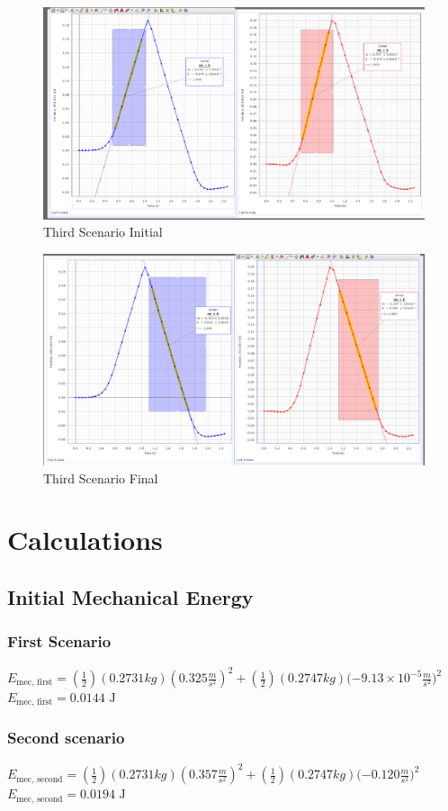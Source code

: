 \documentclass{article}
\begin{document}
\begin{figure}[H]
    \centering
    \includegraphics[width=0.75\linewidth]{third scenario initial.png}
    \caption{Third Scenario Initial}
    \label{fig:tsi}
\end{figure}
\begin{figure}[H]
    \centering
    \includegraphics[width=0.75\linewidth]{third scenario final.png}
    \caption{Third Scenario Final}
    \label{fig:tsf}
\end{figure}

\section{Calculations}
\subsection{Initial Mechanical Energy}
\subsubsection{First Scenario}
$E_{\text {mec, first}}=(\frac {1}{2})(0.2731 {kg})(0.325 \frac {m}{s^2})^2 +(\frac {1}{2})(0.2747 {kg})(-9.13 \times 10^{-5} {\frac {m}{s^2})}^2 $
\newline 
$E_{\text {mec, first}} = 0.0144 \text { J}$
\subsubsection{Second scenario}
$E_{\text {mec, second}}=(\frac {1}{2})(0.2731 {kg})(0.357 \frac {m}{s^2})^2 +(\frac {1}{2})(0.2747 {kg})(-0.120 {\frac {m}{s^2})}^2 $
\newline
$E_{\text {mec, second}} = 0.0194 \text { J}$
\end{document}
